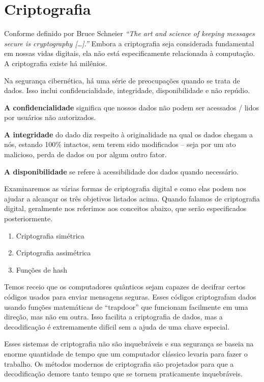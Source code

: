 \section{Criptografia}
Conforme definido por Bruce Schneier \textit{``The art and science of keeping messages secure is cryptography […].''} \cite{13} Embora a criptografia seja considerada fundamental em nossas vidas digitais, ela não está especificamente relacionada à computação. A criptografia existe há milênios.

Na segurança cibernética, há uma série de preocupações quando se trata de dados. Isso inclui confidencialidade, integridade, disponibilidade e não repúdio.

\textbf{A confidencialidade} significa que nossos dados não podem ser acessados / lidos por usuários não autorizados.

\textbf{A integridade} do dado diz respeito à originalidade na qual os dados chegam a nós, estando 100\% intactos, sem terem sido modificados – seja por um ato malicioso, perda de dados ou por algum outro fator. 

\textbf{A disponibilidade} se refere à acessibilidade dos dados quando necessário.

Examinaremos as várias formas de criptografia digital e como elas podem nos ajudar a alcançar os três objetivos listados acima. Quando falamos de criptografia digital, geralmente nos referimos aos conceitos abaixo, que serão especificados posteriormente.

\begin{enumerate}
  \item Criptografia simétrica
  \item Criptografia assimétrica
  \item Funções de hash
\end{enumerate}

Temos receio que os computadores quânticos sejam capazes de decifrar certos códigos usados para enviar mensagens seguras. Esses códigos criptografam dados usando funções matemáticas de ``trapdoor'' que funcionam facilmente em uma direção, mas não em outra. Isso facilita a criptografia de dados, mas a decodificação é extremamente difícil sem a ajuda de uma chave especial.

Esses sistemas de criptografia não são inquebráveis e sua segurança se baseia na enorme quantidade de tempo que um computador clássico levaria para fazer o trabalho. Os métodos modernos de criptografia são projetados para que a decodificação demore tanto tempo que se tornem praticamente inquebráveis.

